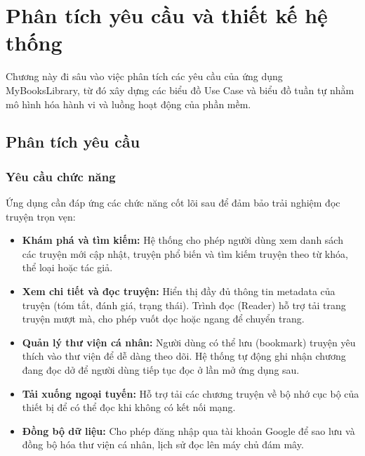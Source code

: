 \chapter{Phân tích yêu cầu và thiết kế hệ thống}

Chương này đi sâu vào việc phân tích các yêu cầu của ứng dụng MyBooksLibrary, từ đó xây dựng các biểu đồ Use Case và biểu đồ tuần tự nhằm mô hình hóa hành vi và luồng hoạt động của phần mềm.

\section{Phân tích yêu cầu}

\subsection{Yêu cầu chức năng}
Ứng dụng cần đáp ứng các chức năng cốt lõi sau để đảm bảo trải nghiệm đọc truyện trọn vẹn:
\begin{itemize}
    \item \textbf{Khám phá và tìm kiếm:} Hệ thống cho phép người dùng xem danh sách các truyện mới cập nhật, truyện phổ biến và tìm kiếm truyện theo từ khóa, thể loại hoặc tác giả.
    \item \textbf{Xem chi tiết và đọc truyện:} Hiển thị đầy đủ thông tin metadata của truyện (tóm tắt, đánh giá, trạng thái). Trình đọc (Reader) hỗ trợ tải trang truyện mượt mà, cho phép vuốt dọc hoặc ngang để chuyển trang.
    \item \textbf{Quản lý thư viện cá nhân:} Người dùng có thể lưu (bookmark) truyện yêu thích vào thư viện để dễ dàng theo dõi. Hệ thống tự động ghi nhận chương đang đọc dở để người dùng tiếp tục đọc ở lần mở ứng dụng sau.
    \item \textbf{Tải xuống ngoại tuyến:} Hỗ trợ tải các chương truyện về bộ nhớ cục bộ của thiết bị để có thể đọc khi không có kết nối mạng.
    \item \textbf{Đồng bộ dữ liệu:} Cho phép đăng nhập qua tài khoản Google để sao lưu và đồng bộ hóa thư viện cá nhân, lịch sử đọc lên máy chủ đám mây.
\end{itemize}

